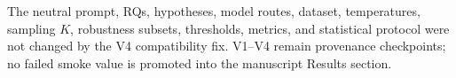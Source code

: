 The neutral prompt, RQs, hypotheses, model routes, dataset, temperatures, sampling $K$, robustness subsets, thresholds, metrics, and statistical protocol were not changed by the V4 compatibility fix. V1--V4 remain provenance checkpoints; no failed smoke value is promoted into the manuscript Results section.
